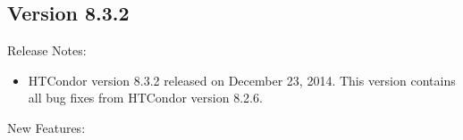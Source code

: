 \subsection*{\label{sec:New-8-3-2}Version 8.3.2}

\noindent Release Notes:

\begin{itemize}

\item HTCondor version 8.3.2 released on December 23, 2014.
This version contains all bug fixes from HTCondor version 8.2.6.

\end{itemize}


\noindent New Features:

